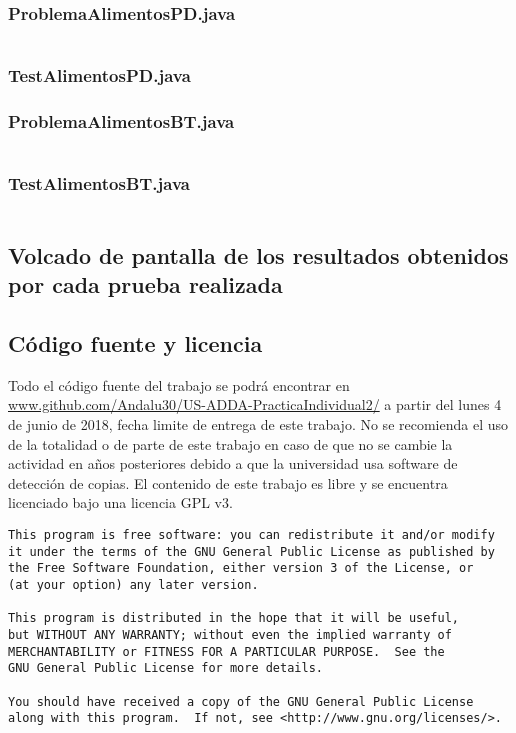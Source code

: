 \documentclass[a4paper,12pt]{article}
\begin{document}
\subsubsection{ProblemaAlimentosPD.java}
\inputminted[fontsize=\footnotesize,breaklines]{java}{src/andalu30/PracticaIndividual2/ProblemaAlimentosPD.java}
\subsubsection{TestAlimentosPD.java}

\subsubsection{ProblemaAlimentosBT.java}
\inputminted[fontsize=\footnotesize,breaklines]{java}{src/andalu30/PracticaIndividual2/ProblemaAlimentosBT.java}
\subsubsection{TestAlimentosBT.java}
\inputminted[fontsize=\footnotesize,breaklines]{java}{src/andalu30/PracticaIndividual2/TestAlimentosBT.java}



\subsection{Volcado de pantalla de los resultados obtenidos por cada prueba realizada}
\subsection{Código fuente y licencia}
Todo el código fuente del trabajo se podrá encontrar en \url{www.github.com/Andalu30/US-ADDA-PracticaIndividual2/}
a partir del lunes 4 de junio de 2018, fecha limite de entrega de este trabajo.
No se recomienda el uso de la totalidad o de parte de este trabajo en caso de que no se cambie la actividad en años posteriores debido a que la universidad usa software de detección de copias.
El contenido de este trabajo es libre y se encuentra licenciado bajo una licencia GPL v3.\\

\begin{verbatim}
This program is free software: you can redistribute it and/or modify
it under the terms of the GNU General Public License as published by
the Free Software Foundation, either version 3 of the License, or
(at your option) any later version.

This program is distributed in the hope that it will be useful,
but WITHOUT ANY WARRANTY; without even the implied warranty of
MERCHANTABILITY or FITNESS FOR A PARTICULAR PURPOSE.  See the
GNU General Public License for more details.

You should have received a copy of the GNU General Public License
along with this program.  If not, see <http://www.gnu.org/licenses/>.

\end{verbatim}
\end{document}
